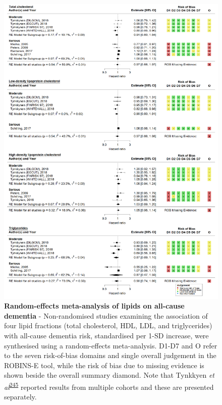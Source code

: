 \documentclass[a4paper, twoside]{templates/ociamthesis}
\begin{document}
\begin{figure}[H]
\includegraphics[width=1\linewidth]{figures/sys-rev/fp_lipids_composite_Dementia} \caption[Random-effects meta-analysis of lipids and all-cause dementia]{\textbf{Random-effects meta-analysis of lipids on all-cause dementia} - Non-randomised studies examining the association of four lipid fractions (total cholesterol, HDL, LDL, and triglycerides) with all-cause dementia risk, standardised per 1-SD increase, were synthesised using a random-effects meta-analysis. D1-D7 and O refer to the seven risk-of-bias domains and single overall judgement in the ROBINS-E tool, while the risk of bias due to missing evidence is shown beside the overall summary diamond. Note that Tynkkyen \emph{et al}\textsuperscript{\protect\hyperlink{ref-tynkkynen2018}{245}} reported results from multiple cohorts and these are presented separately.}\label{fig:lipidFractionsDementia}
\end{figure}
\end{document}
